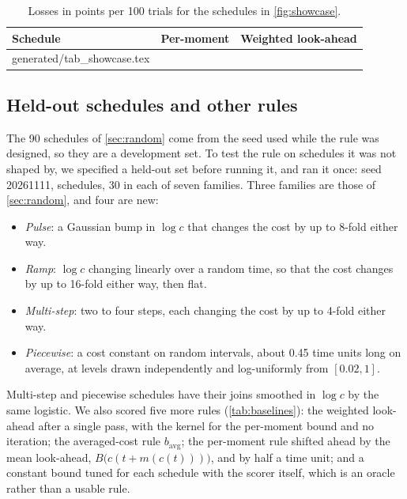 \documentclass[11pt]{article}
\makeatletter
\newcommand\inputrows[1]{\@@input #1 }
\theoremstyle{definition}
\theoremstyle{remark}
\makeatother
\begin{document}
\begin{table}[t]
  \centering
  \caption{Losses in points per 100 trials for the schedules in \cref{fig:showcase}.}
  \label{tab:showcase}
  \begin{tabular}{lrr}
    \toprule
    Schedule & Per-moment & Weighted look-ahead \\
    \midrule
    \inputrows{generated/tab_showcase.tex}
    \bottomrule
  \end{tabular}
\end{table}

\subsection{Held-out schedules and other rules}
\label{sec:heldout}

The 90 schedules of \cref{sec:random} come from the seed used while the rule was designed, so they
are a development set. To test the rule on schedules it was not shaped by, we specified a held-out
set before running it, and ran it once: seed 20261111, \HeldCount{} schedules, 30 in each of seven
families. Three families are those of \cref{sec:random}, and four are new:
\begin{itemize}
  \item \emph{Pulse}: a Gaussian bump in $\log c$ that changes the cost by up to 8-fold either
    way.
  \item \emph{Ramp}: $\log c$ changing linearly over a random time, so that the cost changes by up
    to 16-fold either way, then flat.
  \item \emph{Multi-step}: two to four steps, each changing the cost by up to 4-fold either way.
  \item \emph{Piecewise}: a cost constant on random intervals, about 0.45 time units long on
    average, at levels drawn independently and log-uniformly from $[0.02, 1]$.
\end{itemize}
Multi-step and piecewise schedules have their joins smoothed in $\log c$ by the same logistic. We also scored five more rules (\cref{tab:baselines}): the
weighted look-ahead after a single pass, with the kernel for the per-moment bound and no
iteration; the averaged-cost rule $b_{\mathrm{avg}}$; the per-moment rule shifted ahead by the mean
look-ahead, $B\bigl(c(t + m(c(t)))\bigr)$, and by half a time unit; and a constant bound tuned for
each schedule with the scorer itself, which is an oracle rather than a usable rule.
\end{document}
